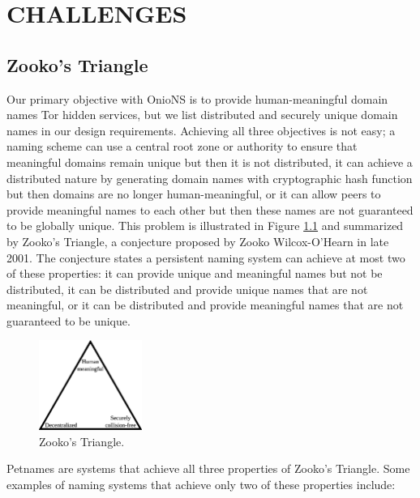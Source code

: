 
\chapter{CHALLENGES}

\section{Zooko's Triangle}
\label{sec:ZookosTriangle}

Our primary objective with OnioNS is to provide human-meaningful domain names Tor hidden services, but we list distributed and securely unique domain names in our design requirements. Achieving all three objectives is not easy; a naming scheme can use a central root zone or authority to ensure that meaningful domains remain unique but then it is not distributed, it can achieve a distributed nature by generating domain names with cryptographic hash function but then domains are no longer human-meaningful, or it can allow peers to provide meaningful names to each other but then these names are not guaranteed to be globally unique. This problem is illustrated in Figure \ref{fig:ZookosTriangle} and summarized by Zooko's Triangle, a conjecture proposed by Zooko Wilcox-O'Hearn in late 2001. The conjecture states a persistent naming system can achieve at most two of these properties: it can provide unique and meaningful names but not be distributed, it can be distributed and provide unique names that are not meaningful, or it can be distributed and provide meaningful names that are not guaranteed to be unique.\cite{ferdous2009security}\cite{stiegler2005petname}

\begin{figure}[htbp]
	\centering
	\includegraphics[width=0.3\textwidth]{images/Zooko.eps}
	\caption{Zooko's Triangle.}
	\label{fig:ZookosTriangle}
\end{figure}

Petnames are systems that achieve all three properties of Zooko's Triangle. Some examples of naming systems that achieve only two of these properties include:

